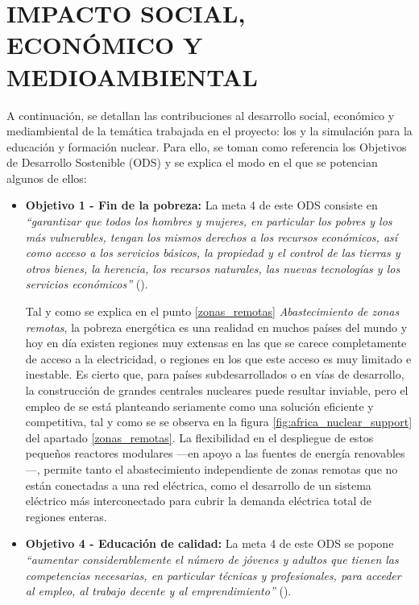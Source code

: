 \newpage
\section{IMPACTO SOCIAL, ECONÓMICO Y MEDIOAMBIENTAL} \label{impacto}

A continuación, se detallan las contribuciones al desarrollo social, económico y mediambiental de la temática trabajada en el proyecto: los  y la simulación para la educación y formación nuclear. Para ello, se toman como referencia los Objetivos de Desarrollo Sostenible (ODS) y se explica el modo en el que se potencian algunos de ellos:

\begin{itemize}
    \item \textbf{Objetivo 1 - Fin de la pobreza:} La meta 4 de este ODS consiste en \textit{``garantizar que todos los hombres y mujeres, en particular los pobres y los más vulnerables, tengan los mismos derechos a los recursos económicos, así como acceso a los servicios básicos, la propiedad y el control de las tierras y otros bienes, la herencia, los recursos naturales, las nuevas tecnologías y los servicios económicos''} (\cite{ODS}).
    
    Tal y como se explica en el punto \ref{zonas_remotas} \textit{Abastecimiento de zonas remotas}, la pobreza energética es una realidad en muchos países del mundo y hoy en día existen regiones muy extensas en las que se carece completamente de acceso a la electricidad, o regiones en los que este acceso es muy limitado e inestable. Es cierto que, para países subdesarrollados o en vías de desarrollo, la construcción de grandes centrales nucleares puede resultar inviable, pero el empleo de  se está planteando seriamente como una solución eficiente y competitiva, tal y como se se observa en la figura \ref{fig:africa_nuclear_support} del apartado \ref{zonas_remotas}. La flexibilidad en el despliegue de estos pequeños reactores modulares ---en apoyo a las fuentes de energía renovables---, permite tanto el abastecimiento independiente de zonas remotas que no están conectadas a una red eléctrica, como el desarrollo de un sistema eléctrico más interconectado para cubrir la demanda eléctrica total de regiones enteras.

    \item \textbf{Objetivo 4 - Educación de calidad:} La meta 4 de este ODS se popone \textit{``aumentar considerablemente el número de jóvenes y adultos que tienen las competencias necesarias, en particular técnicas y profesionales, para acceder al empleo, al trabajo decente y al emprendimiento''} (\cite{ODS}).
    

\end{itemize}
